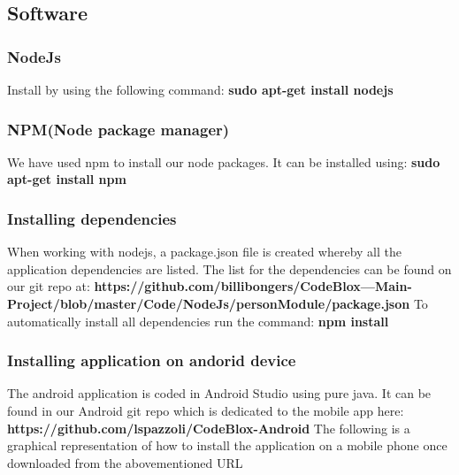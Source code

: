 \documentclass[a4paper,12pt]{article}
\begin{document}
		\subsection{Software}
			\subsubsection{NodeJs}
			Install by using the following command: \newline
			\textbf{sudo apt-get install nodejs}
			\subsubsection{NPM(Node package manager)}
			We have used npm to install our node packages. It can be installed using: \newline
			\textbf{sudo apt-get install npm}
			\subsubsection{Installing dependencies}
			When working with nodejs, a package.json file is created whereby all the application dependencies are listed. The list for the dependencies can be found on our git repo at:
			\textbf{https://github.com/billibongers/CodeBlox---Main-Project/blob/master/Code/NodeJs\newline/personModule/package.json}
			\newline\newline
			To automatically install all dependencies run the command:\newline
			\textbf{npm install}
			\subsubsection{Installing application on andorid device}
			The android application is coded in Android Studio using pure java. It can be found in our Android git repo which is dedicated to the mobile app here:
			\textbf{https://github.com/lspazzoli\newline/CodeBlox-Android}
			\newline\newline
			The following is a graphical representation of how to install the application on a mobile phone once downloaded from the abovementioned URL
			
\end{document}
